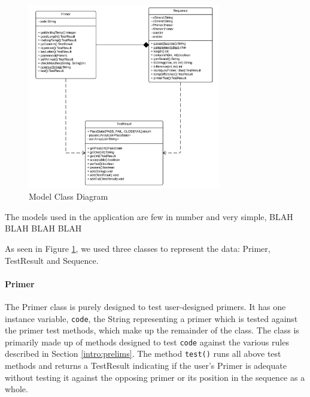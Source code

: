 
\begin{figure}[!t]
  \begin{center}
    \includegraphics[width=0.75\textwidth]{./images/currentBuild/modelClassDiagram.png}
    \caption{
      \label{fig:currentBuild:model}
      Model Class Diagram 
    }
  \end{center}
\end{figure}

The models used in the application are few in number and very simple, BLAH BLAH BLAH BLAH

As seen in Figure \ref{fig:currentBuild:model}, we used three classes to represent the data:
Primer, TestResult and Sequence.

\paragraph{Primer}
The Primer class is purely designed to test user-designed primers. It has 
one instance variable, \texttt{code}, the String representing a primer
which is tested against the primer test methods, which make up the 
remainder of the class. The class is primarily made up of methods 
designed to test \texttt{code} against the various rules described in Section 
\ref{intro:prelims}. The method \texttt{test()} runs all above test 
methods and returns a TestResult indicating if the user's Primer 
is adequate without testing it against the opposing primer or its position
in the sequence as a whole.


